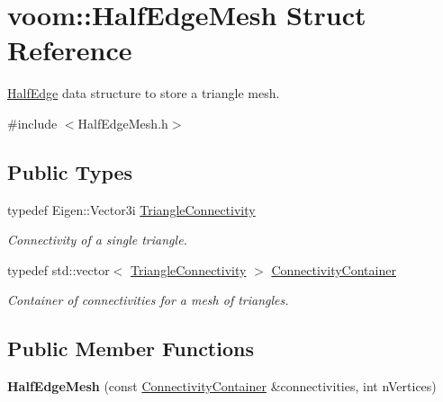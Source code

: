 \hypertarget{structvoom_1_1_half_edge_mesh}{
\section{voom::HalfEdgeMesh Struct Reference}
\label{structvoom_1_1_half_edge_mesh}
}


\hyperlink{structvoom_1_1_half_edge}{HalfEdge} data structure to store a triangle mesh.  


{\ttfamily \#include $<$HalfEdgeMesh.h$>$}\subsection*{Public Types}
\begin{DoxyCompactItemize}
\item 
\hypertarget{structvoom_1_1_half_edge_mesh_a606d2e2f8d6e6c6357befe3b20c0d3d2}{
typedef Eigen::Vector3i \hyperlink{structvoom_1_1_half_edge_mesh_a606d2e2f8d6e6c6357befe3b20c0d3d2}{TriangleConnectivity}}
\label{structvoom_1_1_half_edge_mesh_a606d2e2f8d6e6c6357befe3b20c0d3d2}

\begin{DoxyCompactList}\small\item\em Connectivity of a single triangle. \item\end{DoxyCompactList}\item 
\hypertarget{structvoom_1_1_half_edge_mesh_a8009170d97788692c1451db0123acf3e}{
typedef std::vector$<$ \hyperlink{structvoom_1_1_half_edge_mesh_a606d2e2f8d6e6c6357befe3b20c0d3d2}{TriangleConnectivity} $>$ \hyperlink{structvoom_1_1_half_edge_mesh_a8009170d97788692c1451db0123acf3e}{ConnectivityContainer}}
\label{structvoom_1_1_half_edge_mesh_a8009170d97788692c1451db0123acf3e}

\begin{DoxyCompactList}\small\item\em Container of connectivities for a mesh of triangles. \item\end{DoxyCompactList}\end{DoxyCompactItemize}
\subsection*{Public Member Functions}
\begin{DoxyCompactItemize}
\item 
\hypertarget{structvoom_1_1_half_edge_mesh_ab179b9dd9b646298f7e5afc9c4af5a97}{
{\bfseries HalfEdgeMesh} (const \hyperlink{structvoom_1_1_half_edge_mesh_a8009170d97788692c1451db0123acf3e}{ConnectivityContainer} \&connectivities, int nVertices)}
\label{structvoom_1_1_half_edge_mesh_ab179b9dd9b646298f7e5afc9c4af5a97}

\end{DoxyCompactItemize}
